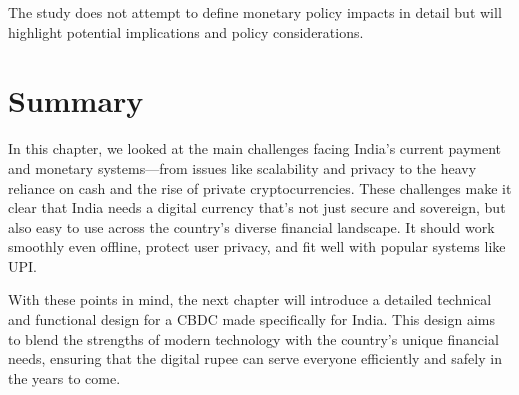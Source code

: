 The study does not attempt to define monetary policy impacts in detail but will highlight potential implications and policy considerations.

\section{Summary}
\label{chp3.summary}

In this chapter, we looked at the main challenges facing India’s current payment and monetary systems—from issues like scalability and privacy to the heavy reliance on cash and the rise of private cryptocurrencies. These challenges make it clear that India needs a digital currency that’s not just secure and sovereign, but also easy to use across the country’s diverse financial landscape. It should work smoothly even offline, protect user privacy, and fit well with popular systems like UPI.

With these points in mind, the next chapter will introduce a detailed technical and functional design for a CBDC made specifically for India. This design aims to blend the strengths of modern technology with the country’s unique financial needs, ensuring that the digital rupee can serve everyone efficiently and safely in the years to come.

 